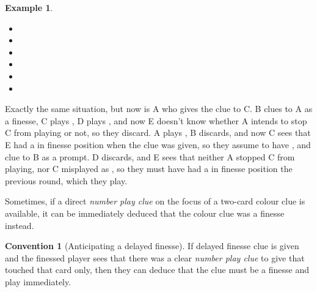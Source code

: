 \documentclass[a4paper]{article}
\theoremstyle{plain}
\theoremstyle{definition}
\newtheorem{example}[theorem]{Example}
\newtheorem{convention}[theorem]{Convention}
\begin{document}
\begin{example}	\hfill \\
	\begin{minipage}{0.45\textwidth}
		\begin{itemize}
			\item[\Large +]      
			\item[\Large A]    
			\item[\Large B]    
			\item[\Large C]    
			\item[\Large D]    
			\item[\Large E]    
		\end{itemize}
	\end{minipage}%
	\begin{minipage}{0.55\textwidth}
		Exactly the same situation, but now is A who gives the  clue to C. B clues  to A as a finesse, C plays , D plays , and now E doesn't know whether A intends to stop C from playing  or not, so they discard. A plays , B discards, and now C sees that E had a  in finesse position when the  clue was given, so they assume to have , and clue  to B as a prompt. D discards, and E sees that neither A stopped C from playing, nor C misplayed  as , so they must have had a  in finesse position the previous round, which they play.
	\end{minipage}
\end{example} \vspace{0.15 cm}

Sometimes, if a direct \emph{number play clue} on the focus of a two-card colour clue is available, it can be immediately deduced that the colour clue was a finesse instead.

\begin{convention}[Anticipating a delayed finesse]
	\label{anticipated-delayed-finesse}
	If delayed finesse clue is given and the finessed player sees that there was a clear \emph{number play clue} to give that touched that card only, then they can deduce that the clue must be a finesse and play immediately.
\end{convention}
\end{document}
